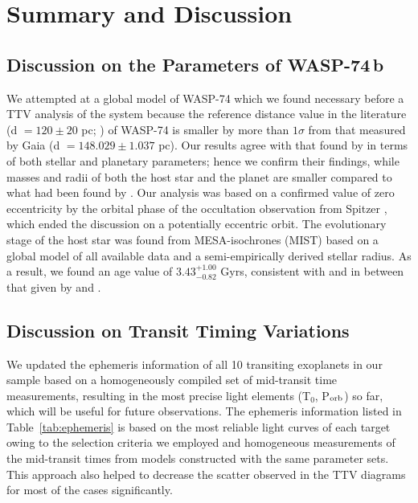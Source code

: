 \documentclass[a4paper,fleqn,usenatbib]{mnras}
\begin{document}
\section{Summary and Discussion}
\label{sec:conclusions}
\subsection{Discussion on the Parameters of WASP-74\,b}
\label{subsec:discssion_parameters}

We attempted at a global model of WASP-74 which we found necessary before a TTV analysis of the system because the reference distance value in the literature (d $ = 120 \pm 20$ pc; \citealt{2015AJ....150...18H}) of WASP-74 is smaller by more than $1\sigma$ from that measured by Gaia (d $= 148.029 \pm 1.037$ pc). Our results agree with that found by \citet{2019MNRAS.485.5168M} in terms of both stellar and planetary parameters; hence we confirm their findings, while masses and radii of both the host star and the planet are smaller compared to what had been found by \citet{2015AJ....150...18H}. Our analysis was based on a confirmed value of zero eccentricity by the orbital phase of the occultation observation from Spitzer \citep{2020AJ....159..137G}, which ended the discussion on a potentially eccentric orbit. The evolutionary stage of the host star was found from MESA-isochrones (MIST) based on a global model of all available data and a semi-empirically derived stellar radius. As a result, we found an age value of $3.43^{+1.00}_{-0.82}$ Gyrs, consistent with and  in between that given by \citet{2015AJ....150...18H} and \citet{2019MNRAS.485.5168M}. 


\subsection{Discussion on Transit Timing Variations}
\label{subsec:discussion_ttv}
We updated the ephemeris information of all 10 transiting exoplanets in our sample based on a homogeneously compiled set of mid-transit time measurements, resulting in the most precise light elements (T$_0$, P$_{\rm orb}$) so far,  which will be useful for future observations.  The ephemeris information listed in Table~\ref{tab:ephemeris} is based on the most reliable light curves of each target owing to the selection criteria we employed and homogeneous measurements of the mid-transit times from models constructed with the same parameter sets. This approach also helped to decrease the scatter observed in the TTV diagrams for most of the cases significantly. 
\end{document}

